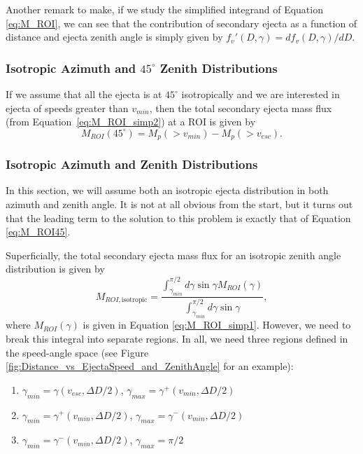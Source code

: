 \documentclass{hitec}
\numberwithin{equation}{section}
\begin{document}
Another remark to make, if we study the simplified integrand of Equation \eqref{eq:M_ROI}, we can see that the contribution of secondary ejecta as a function of distance and ejecta zenith angle is simply given by $f_v'(D,\gamma) = df_v(D,\gamma)/dD$.


\subsubsection{Isotropic Azimuth and $45^\circ$ Zenith Distributions}\label{sssec:IsoAzm45Zen}
If we assume that all the ejecta is at $45^\circ$ isotropically and we are interested in ejecta of speeds greater than $v_{min}$, then the total secondary ejecta mass flux (from Equation~\eqref{eq:M_ROI_simp2}) at a ROI is given by
\begin{equation}\label{eq:M_ROI45}
M_{ROI}(45^\circ) = M_p(>v_{min}) - M_p(>v_{esc}).
\end{equation}


\subsubsection{Isotropic Azimuth and Zenith Distributions}
In this section, we will assume both an isotropic ejecta distribution in both azimuth and zenith angle. It is not at all obvious from the start, but it turns out that the leading term to the solution to this problem is exactly that of Equation \eqref{eq:M_ROI45}.

Superficially, the total secondary ejecta mass flux for an isotropic zenith angle distribution is given by
\begin{equation}\label{eq:M_ROIiso1}
M_{ROI,\text{isotropic}} = \frac{\int_{\gamma_{min}}^{\pi/2}d\gamma\sin\gamma M_{ROI}(\gamma)}{\int_{\gamma_{min}}^{\pi/2}d\gamma\sin\gamma},
\end{equation}
where $M_{ROI}(\gamma)$ is given in Equation \eqref{eq:M_ROI_simp1}. However, we need to break this integral into separate regions. In all, we need three regions defined in the speed-angle space (see Figure \ref{fig:Distance_vs_EjectaSpeed_and_ZenithAngle} for an example):
\begin{enumerate}[label=Region \Roman*:]
	\item $\gamma_{min} = \gamma(v_{esc},\Delta D/2)$, $\gamma_{max} = \gamma^+(v_{min}, \Delta D/2)$
	\item $\gamma_{min} = \gamma^+(v_{min}, \Delta D/2)$, $\gamma_{max} = \gamma^-(v_{min}, \Delta D/2)$
	\item $\gamma_{min} = \gamma^-(v_{min}, \Delta D/2)$, $\gamma_{max} = \pi/2$
\end{enumerate}
\end{document}

